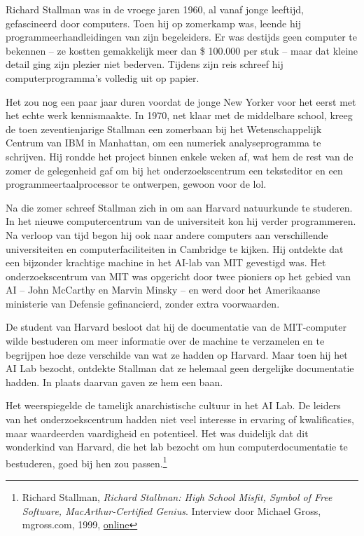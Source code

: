 \documentclass[
  a5paper,
  smalldemyvopaper,11pt,twoside,onecolumn,openright,extrafontsizes,
hidelinks]{memoir}
\begin{document}
Richard Stallman was in de vroege jaren 1960, al vanaf jonge leeftijd,
gefascineerd door computers. Toen hij op zomerkamp was, leende hij
programmeerhandleidingen van zijn begeleiders. Er was destijds geen
computer te bekennen -- ze kostten gemakkelijk meer dan \$ 100.000 per
stuk -- maar dat kleine detail ging zijn plezier niet bederven. Tijdens
zijn reis schreef hij computerprogramma's volledig uit op papier.

Het zou nog een paar jaar duren voordat de jonge New Yorker voor het
eerst met het echte werk kennismaakte. In 1970, net klaar met de
middelbare school, kreeg de toen zeventienjarige Stallman een zomerbaan
bij het Wetenschappelijk Centrum van IBM in Manhattan, om een numeriek
analyseprogramma te schrijven. Hij rondde het project binnen enkele
weken af, wat hem de rest van de zomer de gelegenheid gaf om bij het
onderzoekscentrum een teksteditor en een programmeertaalprocessor te
ontwerpen, gewoon voor de lol.

Na die zomer schreef Stallman zich in om aan Harvard natuurkunde te
studeren. In het nieuwe computercentrum van de universiteit kon hij
verder programmeren. Na verloop van tijd begon hij ook naar andere
computers aan verschillende universiteiten en computerfaciliteiten in
Cambridge te kijken. Hij ontdekte dat een bijzonder krachtige machine in
het AI-lab van MIT gevestigd was. Het onderzoekscentrum van MIT was
opgericht door twee pioniers op het gebied van AI -- John McCarthy en
Marvin Minsky -- en werd door het Amerikaanse ministerie van Defensie
gefinancierd, zonder extra voorwaarden.

De student van Harvard besloot dat hij de documentatie van de
MIT-computer wilde bestuderen om meer informatie over de machine te
verzamelen en te begrijpen hoe deze verschilde van wat ze hadden op
Harvard. Maar toen hij het AI Lab bezocht, ontdekte Stallman dat ze
helemaal geen dergelijke documentatie hadden. In plaats daarvan gaven ze
hem een baan.

Het weerspiegelde de tamelijk anarchistische cultuur in het AI Lab. De
leiders van het onderzoekscentrum hadden niet veel interesse in ervaring
of kwalificaties, maar waardeerden vaardigheid en potentieel. Het was
duidelijk dat dit wonderkind van Harvard, die het lab bezocht om hun
computerdocumentatie te bestuderen, goed bij hen zou passen.\footnote{Richard
  Stallman, \emph{Richard Stallman: High School Misfit, Symbol of Free
  Software, MacArthur-Certified Genius}. Interview door Michael Gross,
  mgross.com, 1999,
  \href{https://www.mgross.com/writing/books/my-generation/bonus-chapters/richard-stallman-high-school-misfit-symbol-of-free-software-macarthur-certified-genius/.}{online}}
\end{document}
